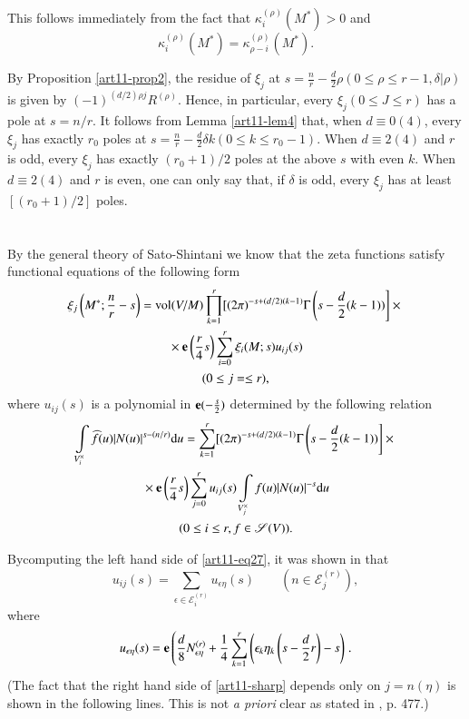 This follows immediately from the fact that $\kappa^{(\rho)}_{i}(M^{*})>0$ and 
$$
\kappa^{(\rho)}_{i}(M^{*})=\kappa^{(\rho)}_{\rho-i}(M^{*}).
$$

By Proposition \ref{art11-prop2}, the residue of $\xi_{j}$ at $s=\frac{n}{r}-\frac{d}{2}\rho(0\leq \rho\leq r-1,\delta|\rho)$ is given by $(-1)^{(d/2)\rho j}R^{(\rho)}$. Hence, in particular, every $\xi_{j}(0\leq J\leq r)$ has a pole at $s=n/r$. It follows from Lemma \ref{art11-lem4} that, when $d\equiv 0(4)$, every $\xi_{j}$ has exactly $r_{0}$ poles at $s=\frac{n}{r}-\frac{d}{2}\delta k(0\leq k\leq r_{0}-1)$. When $d\equiv 2(4)$ and $r$ is odd, every $\xi_{j}$ has exactly $(r_{0}+1)/2$ poles at the above $s$ with even $k$. When $d\equiv 2(4)$ and $r$ is even, one can only say that, if $\delta$ is odd, every $\xi_{j}$ has at least $[(r_{0}+1)/2]$ poles.

\section{}\label{art11-sec6}
By the general theory of Sato-Shintani we know that the zeta functions satisfy functional equations of the following form
\begin{gather}
\xi_{j}\left(M^{*};\frac{n}{r}-s\right)=\text{vol}(V/M)\prod\limits^{r}_{k=1}[(2\pi)^{-s+(d/2)(k-1)}\Gamma\left(s-\dfrac{d}{2}(k-1))\right]\times{}\label{art11-eq26}\\
{}\times \mathbf{e} \left(\dfrac{r}{4}s\right)\sum\limits^{r}_{i=0}\xi_{i}(M;s)u_{ij}(s)\notag\\
(0\leq j=\leq r),\notag
\end{gather}
where $u_{ij}(s)$ is a polynomial in $\mathbf{e}(-\frac{s}{2})$ determined by the following relation 
\begin{gather}
\int\limits_{V^{\times}_{i}}\widehat{f}(u)|N(u)|^{s-(n/r)}\mathrm{d} u=\sum\limits^{r}_{k=1}[(2\pi)^{-s+(d/2)(k-1)}\Gamma\left(s-\dfrac{d}{2}(k-1))\right]\times{}\label{art11-eq27}\\
{}\times \mathbf{e} \left(\dfrac{r}{4}s\right)\sum\limits^{r}_{j=0}u_{ij}(s)\int\limits_{V^{\times}_{j}}f(u)|N(u)|^{-s}\mathrm{d} u\notag\\
(0\leq i\leq r, f\in \mathscr{S}(V)).\notag
\end{gather}

By\pageoriginale computing the left hand side of \eqref{art11-eq27}, it was shown in \cite{art11-keySF} that
\begin{equation*}
u_{ij}(s)=\sum\limits_{\epsilon\in \mathscr{E}^{(r)}_{i}}u_{\epsilon\eta}(s)\qquad (n\in \mathscr{E}^{(r)}_{j}),\tag{$\sharp$}\label{art11-sharp}
\end{equation*}
where
$$
u_{\epsilon\eta}(s)=\mathbf{e}\left(\frac{d}{8}N^{(r)}_{\epsilon\eta}+\frac{1}{4}\sum\limits^{r}_{k=1}\left(\epsilon_{k}\eta_{k}\left(s-\dfrac{d}{2}r\right)-s\right)\right..
$$
(The fact that the right hand side of \eqref{art11-sharp} depends only on $j=n(\eta)$ is shown in the following lines. This is not {\em a priori} clear as stated in \cite{art11-keySF}, p. 477.)

